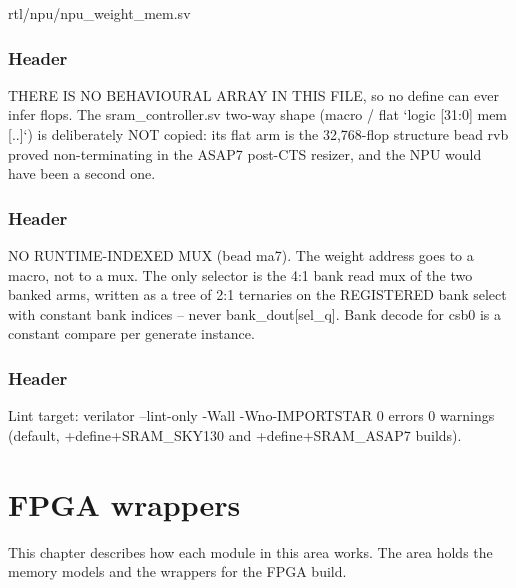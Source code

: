 \begin{relocated}{rtl/npu/npu_weight_mem.sv}

\subsection*{Header}

\begin{textblock}
THERE IS NO BEHAVIOURAL ARRAY IN THIS FILE, so no define can ever infer flops. The
sram_controller.sv two-way shape (macro / flat `logic [31:0] mem [..]`) is deliberately NOT
copied: its flat arm is the 32,768-flop structure bead rvb proved non-terminating in the ASAP7
post-CTS resizer, and the NPU would have been a second one.
\end{textblock}

\subsection*{Header}

\begin{textblock}
NO RUNTIME-INDEXED MUX (bead ma7). The weight address goes to a macro, not to a mux. The only
selector is the 4:1 bank read mux of the two banked arms, written as a tree of 2:1 ternaries on
the REGISTERED bank select with constant bank indices -- never bank_dout[sel_q]. Bank decode for
csb0 is a constant compare per generate instance.
\end{textblock}

\subsection*{Header}

\begin{textblock}
Lint target: verilator --lint-only -Wall -Wno-IMPORTSTAR 0 errors 0 warnings (default,
+define+SRAM_SKY130 and +define+SRAM_ASAP7 builds).
\end{textblock}

\end{relocated}








\chapter{FPGA wrappers}\label{tm:ch:mod-fpga-wrappers}

This chapter describes how each module in this area works. The area holds the memory models and the wrappers for the FPGA build.

